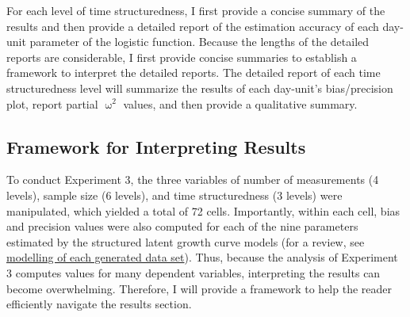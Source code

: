 \documentclass[
12pt, %
twoside,
english]{guelphthesis}
\begin{document}
For each level of time structuredness, I first provide a concise summary of the results and then provide a detailed report of the estimation accuracy of each day-unit parameter of the logistic function. Because the lengths of the detailed reports are considerable, I first provide concise summaries to establish a framework to interpret the detailed reports. The detailed report of each time structuredness level will summarize the results of each day-unit's bias/precision plot, report partial \(\upomega^2\) values, and then provide a qualitative summary.

\hypertarget{framework-for-interpreting-results-2}{%
\subsection{Framework for Interpreting Results}\label{framework-for-interpreting-results-2}}

To conduct Experiment 3, the three variables of number of measurements (4 levels), sample size (6 levels), and time structuredness (3 levels) were manipulated, which yielded a total of 72 cells. Importantly, within each cell, bias and precision values were also computed for each of the nine parameters estimated by the structured latent growth curve models (for a review, see \protect\hyperlink{modelling-data-sets}{modelling of each generated data set}). Thus, because the analysis of Experiment 3 computes values for many dependent variables, interpreting the results can become overwhelming. Therefore, I will provide a framework to help the reader efficiently navigate the results section.
\end{document}
